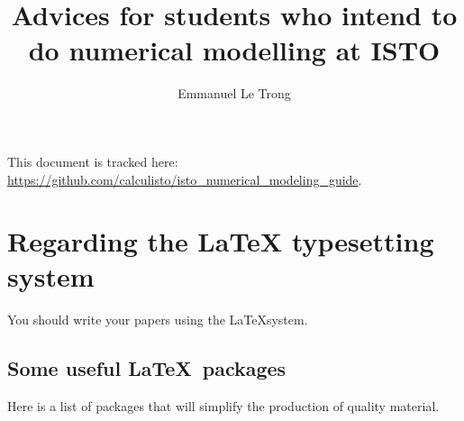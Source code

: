 \documentclass[a4paper]{article}
\title{Advices for students who intend to do numerical modelling at ISTO}
\author{Emmanuel Le Trong}
\begin{document}
\maketitle

{\scriptsize This document is tracked here:
\url{https://github.com/calculisto/isto_numerical_modeling_guide}}.

\tableofcontents

\section{Regarding the \LaTeX{} typesetting system}

You should write your papers using the \LaTeX system. 

\subsection{Some useful \LaTeX\ packages}

Here is a list of packages that will simplify the production of quality material.
\end{document}
